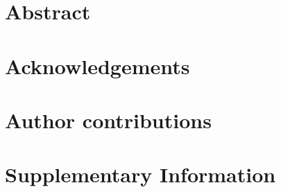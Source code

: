 \documentclass[9pt, twocolumn, lineno]{templates/pi/pi-article}
\begin{document}


\section{Abstract}




\section*{Acknowledgements}


\section*{Author contributions}


\section{Supplementary Information}

\newenvironment{leveldown}%
{
    \let\section\subsection%
    \let\subsection\subsubsection%
    \let\subsubsection\paragraph%
}{}

\newenvironment{levelup}%
{
    \let\subsubsection\subsection%
    \let\subsection\section%
}{}
\end{document}
